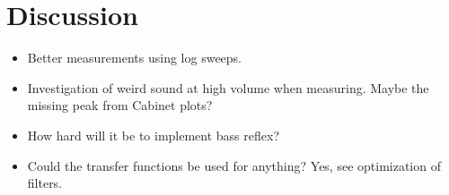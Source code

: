 
\chapter{Discussion}
\label{sec:discussion}
\begin{itemize}
	\item Better measurements using log sweeps.
	\item Investigation of weird sound at high volume when measuring. Maybe the missing peak from Cabinet plots?
	\item How hard will it be to implement bass reflex?
	\item Could the transfer functions be used for anything? Yes, see optimization of filters.
\end{itemize}